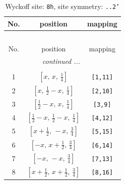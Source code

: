 \documentclass[fleqn,8pt]{jsarticle}
\begin{document}
\begin{longtable}{ccc}
\caption{Wyckoff site: {\tt 8h}, site symmetry: {\tt ..2'}}
 \\
 \hline \hline
No. & position & mapping \\ \hline \endfirsthead

\multicolumn{2}{l}{\tablename\ \thetable{}} \\
 \hline \hline
No. & position & mapping \\ \hline \endhead

 \hline \hline
\multicolumn{2}{r}{\footnotesize\it continued ...} \\ \endfoot

 \hline \hline
\multicolumn{2}{r}{} \\ \endlastfoot

1 & $\left[ x,\, x,\, \frac{1}{4} \right]$ & {\tt [1,11]} \\ \hline
2 & $\left[ x,\, \frac{1}{2} - x,\, \frac{1}{4} \right]$ & {\tt [2,10]} \\ \hline
3 & $\left[ \frac{1}{2} - x,\, x,\, \frac{1}{4} \right]$ & {\tt [3,9]} \\ \hline
4 & $\left[ \frac{1}{2} - x,\, \frac{1}{2} - x,\, \frac{1}{4} \right]$ & {\tt [4,12]} \\ \hline
5 & $\left[ x + \frac{1}{2},\, - x,\, \frac{3}{4} \right]$ & {\tt [5,15]} \\ \hline
6 & $\left[ - x,\, x + \frac{1}{2},\, \frac{3}{4} \right]$ & {\tt [6,14]} \\ \hline
7 & $\left[ - x,\, - x,\, \frac{3}{4} \right]$ & {\tt [7,13]} \\ \hline
8 & $\left[ x + \frac{1}{2},\, x + \frac{1}{2},\, \frac{3}{4} \right]$ & {\tt [8,16]} \\
\end{longtable}
\renewcommand{\arraystretch}{1.2}
\end{document}
